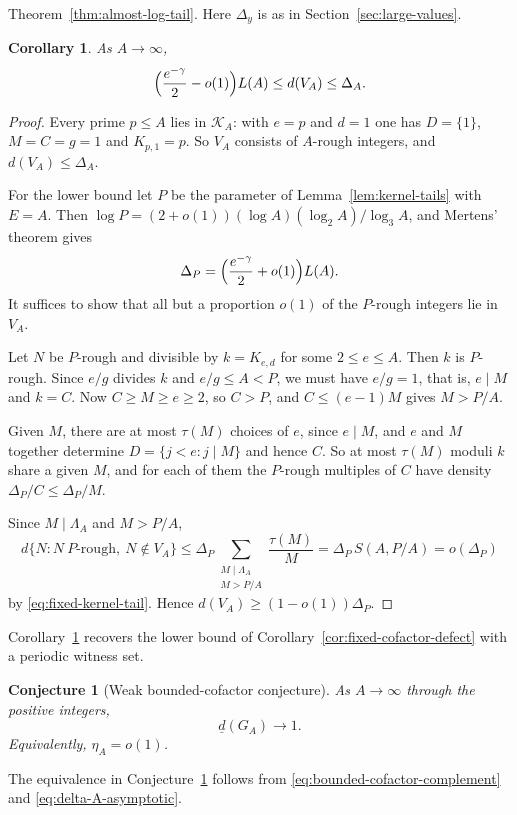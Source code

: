 \documentclass[11pt]{article}
\newtheorem{corollary}[theorem]{Corollary}
\newtheorem{conjecture}[theorem]{Conjecture}
\theoremstyle{remark}
\newcommand{\1}{\mathbf 1}
\newcommand{\lowerdens}{\underline d}
\begin{document}
Theorem~\ref{thm:almost-log-tail}.  Here $\Delta_y$ is as in
Section~\ref{sec:large-values}.
\begin{corollary}\label{cor:fm-envelope-tail}
As $A\to\infty$,
\[
 \Bigl(\frac{e^{-\gamma}}2-o(1)\Bigr)L(A)\leq d(V_A)\leq\Delta_A .
\]
\end{corollary}
\begin{proof}
Every prime $p\leq A$ lies in $\mathcal K_A$: with $e=p$ and $d=1$ one has
$D=\{1\}$, $M=C=g=1$ and $K_{p,1}=p$.  So $V_A$ consists of $A$-rough
integers, and $d(V_A)\leq\Delta_A$.

For the lower bound let $P$ be the parameter of
Lemma~\ref{lem:kernel-tails} with $E=A$.  Then
$\log P=(2+o(1))(\log A)(\log_2A)/\log_3A$, and Mertens' theorem gives
\[
 \Delta_P=\Bigl(\frac{e^{-\gamma}}2+o(1)\Bigr)L(A).
\]
It suffices to show that all but a proportion $o(1)$ of the $P$-rough
integers lie in $V_A$.

Let $N$ be $P$-rough and divisible by $k=K_{e,d}$ for some $2\leq e\leq A$.
Then $k$ is $P$-rough.  Since $e/g$ divides $k$ and $e/g\leq A<P$, we must
have $e/g=1$, that is, $e\mid M$ and $k=C$.  Now $C\geq M\geq e\geq2$, so
$C>P$, and $C\leq(e-1)M$ gives $M>P/A$.

Given $M$, there are at most $\tau(M)$ choices of $e$, since $e\mid M$, and
$e$ and $M$ together determine $D=\{j<e:j\mid M\}$ and hence $C$.  So at
most $\tau(M)$ moduli $k$ share a given $M$, and for each of them the
$P$-rough multiples of $C$ have density $\Delta_P/C\leq\Delta_P/M$.

Since $M\mid\Lambda_A$ and $M>P/A$,
\[
 d\{N:N\ \text{$P$-rough},\ N\notin V_A\}
 \leq\Delta_P\sum_{\substack{M\mid\Lambda_A\\ M>P/A}}\frac{\tau(M)}M
 =\Delta_P\,S(A,P/A)=o(\Delta_P)
\]
by \eqref{eq:fixed-kernel-tail}.  Hence $d(V_A)\geq(1-o(1))\Delta_P$.
\end{proof}

Corollary~\ref{cor:fm-envelope-tail} recovers the lower bound of
Corollary~\ref{cor:fixed-cofactor-defect} with a periodic witness set.

\begin{conjecture}[Weak bounded-cofactor conjecture]
\label{conj:bounded-cofactor-weak}
As $A\to\infty$ through the positive integers,
\[
 \lowerdens(G_A)\longrightarrow1.
\]
Equivalently, $\eta_A=o(1)$.
\end{conjecture}

The equivalence in Conjecture~\ref{conj:bounded-cofactor-weak} follows from
\eqref{eq:bounded-cofactor-complement} and
\eqref{eq:delta-A-asymptotic}.
\end{document}
